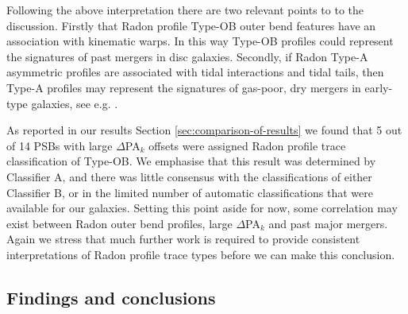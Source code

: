 Following the above interpretation there are two relevant points to to the discussion. Firstly that Radon profile Type-OB outer bend features have an association with kinematic warps. In this way Type-OB profiles could represent the signatures of past mergers in disc galaxies. Secondly, if Radon Type-A asymmetric profiles are associated with tidal interactions and tidal tails, then Type-A profiles may represent the signatures of gas-poor, dry mergers in early-type galaxies, see e.g.  \cite{2005AJ....130.2647V}. 




As reported in our results Section \ref{sec:comparison-of-results} we found that 5 out of 14 PSBs with large $\Delta$PA$_{k}$ offsets were assigned Radon profile trace classification of Type-OB. We emphasise that this result was determined by Classifier A, and there was little consensus with the classifications of either Classifier B, or in the limited number of automatic classifications that were available for our galaxies. Setting this point aside for now, some correlation may exist between Radon outer bend profiles, large $\Delta$PA$_{k}$ and past major mergers. Again we stress that much further work is required to provide consistent interpretations of Radon profile trace types before we can make this conclusion.

\subsection{Findings and conclusions}
\label{findings}

